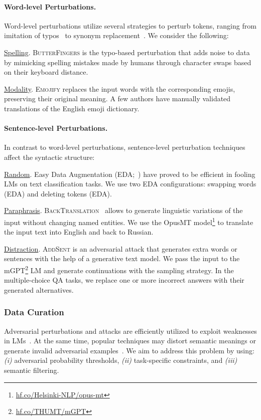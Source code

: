 \documentclass[11pt]{article}
\begin{document}
\paragraph{Word-level Perturbations.} Word-level perturbations utilize several strategies to perturb tokens, ranging from imitation of typos~\cite{jin2020bert} to synonym replacement~\cite{wei-zou-2019-eda}. We consider the following:

\noindent \underline{Spelling}. \textsc{ButterFingers} is the typo-based perturbation that adds noise to data by mimicking spelling mistakes made by humans through character swaps based on their keyboard distance.

\noindent\underline{Modality}. \textsc{Emojify} replaces the input words with the corresponding emojis, preserving their original meaning. A few authors have manually validated translations of the English emoji dictionary.

\paragraph{Sentence-level Perturbations.} In contrast to word-level perturbations, sentence-level perturbation techniques affect the syntactic structure:

\noindent\underline{Random}. Easy Data Augmentation (\textsc{EDA};~\citealp{wei-zou-2019-eda}) have proved to be efficient in fooling LMs on text classification tasks. We use two \textsc{EDA} configurations: swapping words (\textsc{EDA}) and deleting tokens (\textsc{EDA}).
    
\noindent\underline{Paraphrasis}. \textsc{BackTranslation}~\cite{yaseen-and-langer-backtranslation-ner} allows to generate linguistic variations of the input without changing named entities. We use the OpusMT model\footnote{\href{https://huggingface.co/Helsinki-NLP}{hf.co/Helsinki-NLP/opus-mt}} to translate the input text into English and back to Russian.

\noindent\underline{Distraction}. \textsc{AddSent} is an adversarial attack that generates extra words or sentences with the help of a generative text model. We pass the input to the mGPT\footnote{\href{https://huggingface.co/THUMT/mGPT}{hf.co/THUMT/mGPT}} LM and generate continuations with the sampling strategy. In the multiple-choice QA tasks, we replace one or more incorrect answers with their generated alternatives.

\subsubsection{Data Curation}
Adversarial perturbations and attacks are efficiently utilized to exploit weaknesses in LMs~\cite{goel-etal-2021-robustness}. At the same time, popular techniques may distort semantic meanings or generate invalid adversarial examples~\cite{wang2021adversarial}. We aim to address this problem by using: \emph{(i)} adversarial probability thresholds, \emph{(ii)} task-specific constraints, and \emph{(iii)} semantic filtering.
\end{document}
